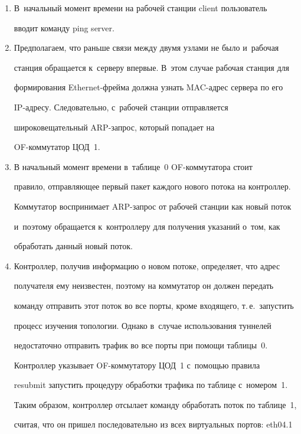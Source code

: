 \begin{enumerate}


\item В~начальный момент времени на рабочей станции client пользователь 


вводит команду ping server.


\item Предполагаем, что раньше связи между двумя узлами не было и~рабочая 


станция обращается к~серверу впервые. В~этом случае рабочая станция для 


формирования Ethernet-фрей\-ма должна узнать MAC-ад\-рес сервера по его  


IP-ад\-ре\-су. Следовательно, с~рабочей станции отправляется 


широковещательный ARP-за\-прос, который попадает на  


OF-ком\-му\-та\-тор ЦОД~1.


\item В начальный момент времени в~таб\-ли\-це~0 OF-ком\-му\-та\-то\-ра стоит 


правило, отправляющее первый пакет каждого нового потока на контроллер. 


Коммутатор воспринимает ARP-за\-прос от рабочей станции  как новый поток 


и~поэтому обращается к~контроллеру для получения указаний о~том, как 


обработать данный новый поток.


\item Контроллер, получив информацию о новом потоке, определяет, что адрес 


получателя ему неизвестен, поэтому на коммутатор он должен передать 


команду отправить этот поток во все порты, кроме входящего, т.\,е.\ запустить 


процесс изучения топологии. Однако в~случае использования туннелей 


недостаточно отправить трафик во все порты при помощи таблицы~0. 


Конт\-рол\-лер указывает OF-ком\-му\-та\-то\-ру ЦОД~1 с~помощью правила 


resubmit запустить процедуру обработки трафика по таблице с~номером~1. 


Таким образом, конт\-рол\-лер отсылает команду обработать поток по таблице~1, 


считая, что он пришел последовательно из всех виртуальных портов: eth04.1 



\end{enumerate}
